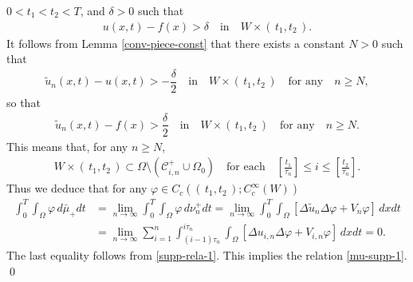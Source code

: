 \documentclass[12pt]{amsart}
\begin{document}
$0< t_1 < t_2 < T$, and ${\delta}>0$ such that  
\begin{align*}
u(x,t) - f(x) > {\delta} \quad \text{in} \quad W \times (\, t_1, t_2 \,). 
\end{align*}
It follows from Lemma \ref{conv-piece-const} that there exists a constant $N>0$ such that 
\begin{align*}
\tilde{u}_n(x,t) - u(x,t) > - \dfrac{\delta}{2} \quad \text{in} \quad W \times (\, t_1, t_2 \,) \quad \text{for any} \quad n \ge N, 
\end{align*}
so that 
\begin{align*}
\tilde{u}_n(x,t) - f(x) > \dfrac{\delta}{2} \quad \text{in} \quad W \times (\, t_1, t_2 \,) \quad \text{for any} \quad n \ge N. 
\end{align*}
This means that, for any $n \ge N$,  
\begin{align} \label{supp-rela-1}
W \times (\, t_1, t_2 \,) \subset \Omega \setminus ({\mathcal{C}}^{+}_{i,n} \cup \Omega_0) 
\quad \text{for each} \quad \left[ \frac{t_1}{\tau_n}\right] \le i \le  \left[ \frac{t_2}{\tau_n} \right]. 
\end{align}
Thus we deduce that for any ${\varphi} \in C_c((\, t_1,t_2 \,);C^{\infty}_{c}(W))$ 
\begin{align*}
\int^T_0 \!\!\! \int_\Omega {\varphi} \, d \bar{\mu}_+ dt 
 &= \lim_{n \to \infty} \int^T_0 \!\!\! \int_\Omega {\varphi} \, d \nu^{+}_{n} dt 
  = \lim_{n \to \infty} \int^T_0 \!\!\! \int_\Omega \left[ \Delta \tilde{u}_n \Delta {\varphi} + V_n {\varphi} \right] \, dx dt \\
 &= \lim_{n \to \infty} \sum^{n}_{i=1} 
        \int^{i \tau_n}_{(i-1) \tau_n}  \! \int_\Omega \left[ \Delta u_{i,n} \Delta {\varphi} + V_{i,n} {\varphi} \right] \, dx dt =0. 
\end{align*}
The last equality follows from \eqref{supp-rela-1}. This implies the relation \eqref{mu-supp-1}. 
\qed
\end{document}
